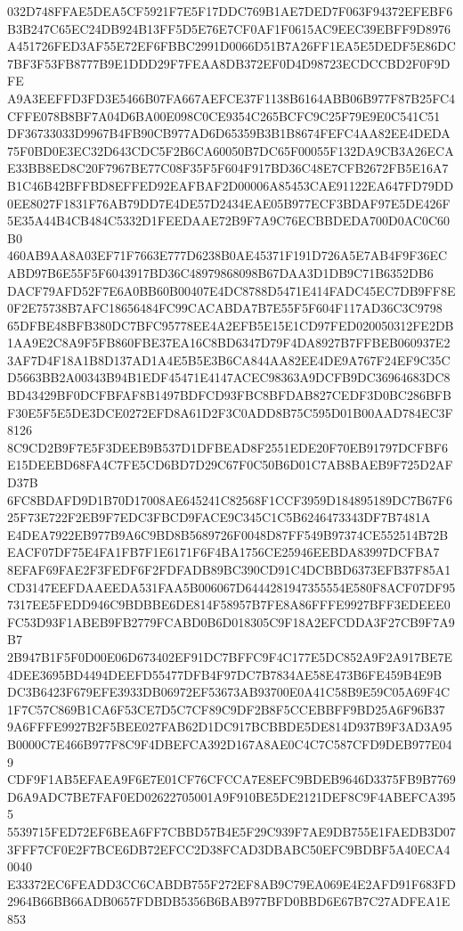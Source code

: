 \documentclass[UTF8,fontset=fandol,zihao=-4,a4paper]{ctexart}
\begin{document}
{{032D748FFAE5DEA5CF5921F7E5F17DDC769B1AE7DED7F063F94372EFEBF6B3B247C65EC24DB924B13FF5D5E76E7CF0AF1F0615AC9EEC39EBFF9D8976
A451726FED3AF55E72EF6FBBC2991D0066D51B7A26FF1EA5E5DEDF5E86DC7BF3F53FB8777B9E1DDD29F7FEAA8DB372EF0D4D98723ECDCCBD2F0F9DFE
A9A3EEFFD3FD3E5466B07FA667AEFCE37F1138B6164ABB06B977F87B25FC4CFFE078B8BF7A04D6BA00E098C0CE9354C265BCFC9C25F79E9E0C541C51
DF36733033D9967B4FB90CB977AD6D65359B3B1B8674FEFC4AA82EE4DEDA75F0BD0E3EC32D643CDC5F2B6CA60050B7DC65F00055F132DA9CB3A26ECA
E33BB8ED8C20F7967BE77C08F35F5F604F917BD36C48E7CFB2672FB5E16A7B1C46B42BFFBD8EFFED92EAFBAF2D00006A85453CAE91122EA647FD79DD
0EE8027F1831F76AB79DD7E4DE57D2434EAE05B977ECF3BDAF97E5DE426F5E35A44B4CB484C5332D1FEEDAAE72B9F7A9C76ECBBDEDA700D0AC0C60B0
460AB9AA8A03EF71F7663E777D6238B0AE45371F191D726A5E7AB4F9F36ECABD97B6E55F5F6043917BD36C48979868098B67DAA3D1DB9C71B6352DB6
DACF79AFD52F7E6A0BB60B00407E4DC8788D5471E414FADC45EC7DB9FF8E0F2E75738B7AFC18656484FC99CACABDA7B7E55F5F604F117AD36C3C9798
65DFBE48BFB380DC7BFC95778EE4A2EFB5E15E1CD97FED020050312FE2DB1AA9E2C8A9F5FB860FBE37EA16C8BD6347D79F4DA8927B7FFBEB060937E2
3AF7D4F18A1B8D137AD1A4E5B5E3B6CA844AA82EE4DE9A767F24EF9C35CD5663BB2A00343B94B1EDF45471E4147ACEC98363A9DCFB9DC36964683DC8
BD43429BF0DCFBFAF8B1497BDFCD93FBC8BFDAB827CEDF3D0BC286BFBF30E5F5E5DE3DCE0272EFD8A61D2F3C0ADD8B75C595D01B00AAD784EC3F8126
8C9CD2B9F7E5F3DEEB9B537D1DFBEAD8F2551EDE20F70EB91797DCFBF6E15DEEBD68FA4C7FE5CD6BD7D29C67F0C50B6D01C7AB8BAEB9F725D2AFD37B
6FC8BDAFD9D1B70D17008AE645241C82568F1CCF3959D184895189DC7B67F625F73E722F2EB9F7EDC3FBCD9FACE9C345C1C5B6246473343DF7B7481A
E4DEA7922EB977B9A6C9BD8B5689726F0048D87FF549B97374CE552514B72BEACF07DF75E4FA1FB7F1E6171F6F4BA1756CE25946EEBDA83997DCFBA7
8EFAF69FAE2F3FEDF6F2FDFADB89BC390CD91C4DCBBD6373EFB37F85A1CD3147EEFDAAEEDA531FAA5B006067D6444281947355554E580F8ACF07DF95
7317EE5FEDD946C9BDBBE6DE814F58957B7FE8A86FFFE9927BFF3EDEEE0FC53D93F1ABEB9FB2779FCABD0B6D018305C9F18A2EFCDDA3F27CB9F7A9B7
2B947B1F5F0D00E06D673402EF91DC7BFFC9F4C177E5DC852A9F2A917BE7E4DEE3695BD4494DEEFD55477DFB4F97DC7B7834AE58E473B6FE459B4E9B
DC3B6423F679EFE3933DB06972EF53673AB93700E0A41C58B9E59C05A69F4C1F7C57C869B1CA6F53CE7D5C7CF89C9DF2B8F5CCEBBFF9BD25A6F96B37
9A6FFFE9927B2F5BEE027FAB62D1DC917BCBBDE5DE814D937B9F3AD3A95B0000C7E466B977F8C9F4DBEFCA392D167A8AE0C4C7C587CFD9DEB977E049
CDF9F1AB5EFAEA9F6E7E01CF76CFCCA7E8EFC9BDEB9646D3375FB9B7769D6A9ADC7BE7FAF0ED02622705001A9F910BE5DE2121DEF8C9F4ABEFCA3955
5539715FED72EF6BEA6FF7CBBD57B4E5F29C939F7AE9DB755E1FAEDB3D073FFF7CF0E2F7BCE6DB72EFCC2D38FCAD3DBABC50EFC9BDBF5A40ECA40040
E33372EC6FEADD3CC6CABDB755F272EF8AB9C79EA069E4E2AFD91F683FD2964B66BB66ADB0657FDBDB5356B6BAB977BFD0BBD6E67B7C27ADFEA1E853
}}
\end{document}

